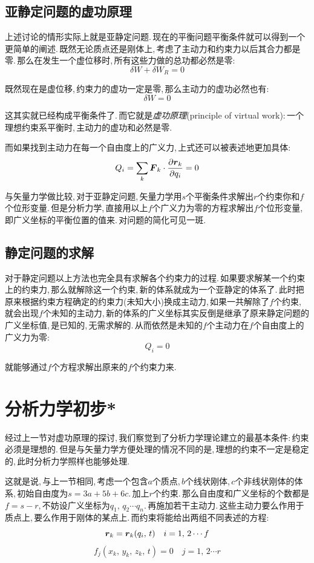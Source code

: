 \subsection{亚静定问题的虚功原理}

上述讨论的情形实际上就是亚静定问题.\,现在的平衡问题平衡条件就可以得到一个更简单的阐述.\,既然无论质点还是刚体上,\,考虑了主动力和约束力以后其合力都是零.\,那么在发生一个虚位移时,\,所有这些力做的总功都必然是零:
\[\delta W+\delta W_R=0 \]

既然现在是虚位移,\,约束力的虚功一定是零,\,那么主动力的虚功必然也有:
\[\delta W=0\]

这其实就已经构成平衡条件了.\,而它就是\emph{虚功原理}(principle of virtual work):\,一个理想约束系平衡时,\,主动力的虚功和必然是零.

而如果找到主动力在每一个自由度上的广义力,\,上式还可以被表述地更加具体:
\[Q_i=\sum_k \boldsymbol{F}_k\cdot \frac{\partial \boldsymbol{r}_k}{\partial q_i}=0\]

与矢量力学做比较,\,对于亚静定问题,\,矢量力学用$s$个平衡条件求解出$r$个约束你和$f$个位形变量.\,但是分析力学,\,直接用以上$f$个广义力为零的方程求解出$f$个位形变量,\,即广义坐标的平衡位置的值来.\,对问题的简化可见一斑.

\subsection{静定问题的求解}

对于静定问题以上方法也完全具有求解各个约束力的过程.\,如果要求解某一个约束上的约束力,\,那么就解除这一个约束,\,新的体系就成为一个亚静定的体系了.\,此时把原来根据约束方程确定的约束力(未知大小)换成主动力,\,如果一共解除了$f$个约束,\,就会出现$f$个未知的主动力,\,新的体系的广义坐标其实反倒是继承了原来静定问题的广义坐标值,\,是已知的,\,无需求解的.\,从而依然是未知的$f$个主动力在$f$个自由度上的广义力为零:
\[Q_i=0\]

就能够通过$f$个方程求解出原来的$f$个约束力来.

\section{分析力学初步*}

经过上一节对虚功原理的探讨,\,我们察觉到了分析力学理论建立的最基本条件:\,约束必须是理想的.\,但是与矢量力学方便处理的情况不同的是,\,理想的约束不一定是稳定的,\,此时分析力学照样也能够处理.

这就是说,\,与上一节相同,\,考虑一个包含$a$个质点,\,$b$个线状刚体,\,$c$个非线状刚体的体系,\,初始自由度为$s=3a+5b+6c$.\,加上$r$个约束.\,那么自由度和广义坐标的个数都是$f=s-r$,\,不妨设广义坐标为$q_1,\,q_2\cdots q_n$.\,再施加若干主动力.\,这些主动力要么作用于质点上,\,要么作用于刚体的某点上.\,而约束将能给出两组不同表述的方程:
\[\boldsymbol{r}_k=\boldsymbol{r}_k(q_i,\,t)\quad i=1,\,2\cdots f\]
\[f_j(x_k,\,y_k,\,z_k,\,t)=0\quad j=1,\,2\cdots r\]

